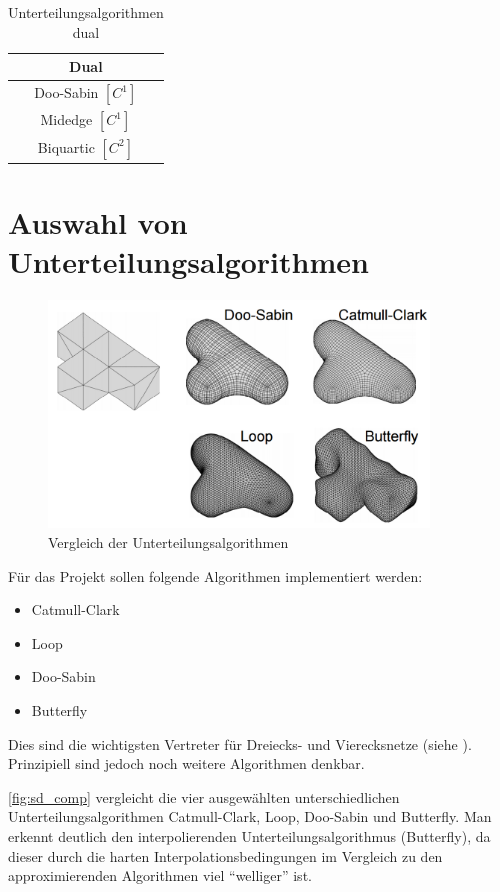 \begin{table}
\center
\caption{Unterteilungsalgorithmen dual \cite[S. 65]{Zorin.subdivcourse}}
\label{tab:sd_comp_dual}
\begin{tabular}{c}
\\
\hline
\textbf{Dual}\\
\hline
Doo-Sabin \([C^1]\) \\
Midedge \([C^1]\) \\
Biquartic \([C^2]\) \\
\end{tabular}
\end{table}

\section{Auswahl von Unterteilungsalgorithmen}

\begin{figure}
  \centering
  \includegraphics[width=0.9\textwidth]{content/media/sd_overview.png}
  \caption{Vergleich der Unterteilungsalgorithmen \cite{Standford.24.07.2015}}
  \label{fig:sd_comp}
\end{figure}

Für das Projekt sollen folgende Algorithmen implementiert werden:
\begin{itemize}
	\item Catmull-Clark
	\item Loop
	\item Doo-Sabin
	\item Butterfly
\end{itemize}
Dies sind die wichtigsten Vertreter für Dreiecks- und Vierecksnetze
(siehe \cite[S. 65ff]{Zorin.subdivcourse} \cite{Zorin01aunified}).
Prinzipiell sind jedoch noch weitere Algorithmen denkbar.

\autoref{fig:sd_comp} vergleicht die vier ausgewählten
unterschiedlichen Unterteilungsalgorithmen Catmull-Clark, Loop, Doo-Sabin und Butterfly.
Man erkennt deutlich den interpolierenden Unterteilungsalgorithmus (Butterfly),
da dieser durch die harten Interpolationsbedingungen im
Vergleich zu den approximierenden Algorithmen viel \enquote{welliger} ist.
\cite{Zorin.subdivcourse}








